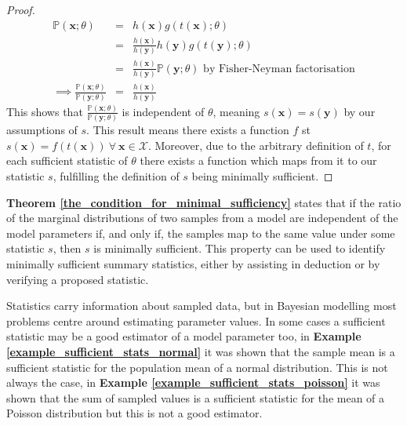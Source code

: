 \documentclass[11pt,a4paper]{article}
\newcommand*{\prob}{\mathbb{P}}
\theoremstyle{break}
\begin{document}
\begin{box_theorem}
\begin{proof}
      \[\begin{array}{rcl}
        \prob(\mathbf{x};\theta)&=&h(\mathbf{x})g(t(\mathbf{x});\theta)\\
        &=&\frac{h(\mathbf{x})}{h(\mathbf{y})}h(\mathbf{y})g(t(\mathbf{y});\theta)\\
        &=&\frac{h(\mathbf{x})}{h(\mathbf{y})}\prob(\mathbf{y};\theta)\text{ by Fisher-Neyman factorisation}\\
        \implies\frac{\prob(\mathbf{x};\theta)}{\prob(\mathbf{y};\theta)}&=&\frac{h(\mathbf{x})}{h(\mathbf{y})}
      \end{array}\]
      This shows that $\frac{\prob(\mathbf{x};\theta)}{\prob(\mathbf{y};\theta)}$ is independent of $\theta$, meaning $s(\mathbf{x})=s(\mathbf{y})$ by our assumptions of $s$. This result means there exists a function $f$ st $s(\mathbf{x})=f(t(\mathbf{x}))\ \forall\ \mathbf{x}\in\mathcal{X}$. Moreover, due to the arbitrary definition of $t$, for each sufficient statistic of $\theta$ there exists a function which maps from it to our statistic $s$, fulfilling the definition of $s$ being minimally sufficient.
    \end{proof}
  \end{box_theorem}

  \textbf{Theorem \ref{the_condition_for_minimal_sufficiency}} states that if the ratio of the marginal distributions of two samples from a model are independent of the model parameters if, and only if, the samples map to the same value under some statistic $s$, then $s$ is minimally sufficient. This property can be used to identify minimally sufficient summary statistics, either by assisting in deduction or by verifying a proposed statistic.

  \par Statistics carry information about sampled data, but in Bayesian modelling most problems centre around estimating parameter values. In some cases a sufficient statistic may be a good estimator of a model parameter too, in \textbf{Example \ref{example_sufficient_stats_normal}} it was shown that the sample mean is a sufficient statistic for the population mean of a normal distribution. This is not always the case, in \textbf{Example \ref{example_sufficient_stats_poisson}} it was shown that the sum of sampled values is a sufficient statistic for the mean of a Poisson distribution but this is not a good estimator.
\end{document}
